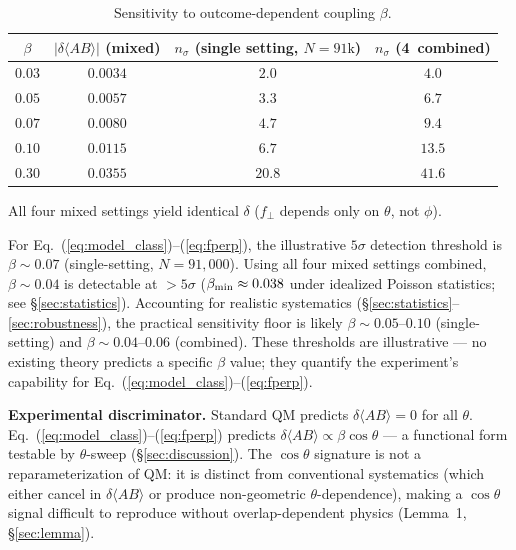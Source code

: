 \documentclass[twocolumn,aps,pra,superscriptaddress,floatfix,10pt]{revtex4-2}
\begin{document}
\begin{table}[H]
\centering
\caption{Sensitivity to outcome-dependent coupling $\beta$.}
\label{tab:sensitivity}
\begin{tabular}{cccc}
\toprule
$\beta$ & $|\delta\langle AB\rangle|$ (mixed) & $n_\sigma$ (single setting, $N{=}91\text{k}$) & $n_\sigma$ (4~combined) \\
\midrule
$0.03$ & $0.0034$ & $2.0$ & $4.0$ \\
$0.05$ & $0.0057$ & $3.3$ & $6.7$ \\
$0.07$ & $0.0080$ & $4.7$ & $9.4$ \\
$0.10$ & $0.0115$ & $6.7$ & $13.5$ \\
$0.30$ & $0.0355$ & $20.8$ & $41.6$ \\
\bottomrule
\end{tabular}
\end{table}

All four mixed settings yield identical $\delta$ ($f_\perp$ depends only on $\theta$, not $\phi$).

For Eq.~(\ref{eq:model_class})--(\ref{eq:fperp}), the illustrative $5\sigma$ detection
threshold is $\beta \sim 0.07$ (single-setting, $N = 91{,}000$). Using all four
mixed settings combined, $\beta \sim 0.04$ is detectable at ${>}5\sigma$ ($\beta_{\rm min} \approx 0.038$
under idealized Poisson statistics; see \S\ref{sec:statistics}). Accounting for realistic
systematics (\S\ref{sec:statistics}--\ref{sec:robustness}), the practical sensitivity floor is likely
$\beta \sim 0.05$--$0.10$ (single-setting) and $\beta \sim 0.04$--$0.06$ (combined). These
thresholds are illustrative --- no existing theory predicts a specific $\beta$
value; they quantify the experiment's capability for Eq.~(\ref{eq:model_class})--(\ref{eq:fperp}).

\textbf{Experimental discriminator.} Standard QM predicts $\delta\langle AB\rangle = 0$ for all $\theta$.
Eq.~(\ref{eq:model_class})--(\ref{eq:fperp}) predicts $\delta\langle AB\rangle \propto \beta \cos\theta$ --- a
functional form testable by $\theta$-sweep (\S\ref{sec:discussion}). The $\cos\theta$ signature is not a
reparameterization of QM: it is distinct from conventional systematics
(which either cancel in $\delta\langle AB\rangle$ or produce non-geometric $\theta$-dependence),
making a $\cos\theta$ signal difficult to reproduce without overlap-dependent
physics (Lemma~1, \S\ref{sec:lemma}).
\end{document}
